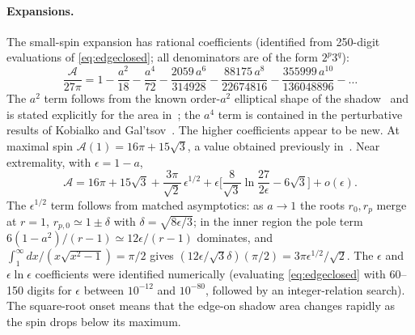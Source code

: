 \documentclass[11pt,a4paper]{article}
\theoremstyle{remark}
\numberwithin{equation}{section}
\begin{document}
\paragraph{Expansions.} The small-spin expansion has rational coefficients (identified from 250-digit
evaluations of \eqref{eq:edgeclosed}; all denominators are of the form $2^p3^q$):
\begin{equation}
\frac{\mathcal A}{27\pi}=1-\frac{a^2}{18}-\frac{a^4}{72}-\frac{2059\,a^6}{314928}-\frac{88175\,a^8}{22674816}
-\frac{355999\,a^{10}}{136048896}-\dots
\end{equation}
The $a^2$ term follows from the known order-$a^2$ elliptical shape of the shadow~\cite{Bozza2006,GrallaLupsasca2020shape}
and is stated explicitly for the area in~\cite{Hassanabadi2026}; the $a^4$ term is contained in the perturbative results of
Kobialko and Gal'tsov~\cite{KobialkoGaltsov2026}. The higher coefficients appear to be new. At maximal spin $\mathcal A(1)=16\pi+15\sqrt3$, a value
obtained previously in~\cite{CunhaHerdeiroRadu2019,FengLu2020}. Near extremality, with $\epsilon=1-a$,
\begin{equation}
\mathcal A=16\pi+15\sqrt3+\frac{3\pi}{\sqrt2}\,\epsilon^{1/2}
+\epsilon\Big[\frac{8}{\sqrt3}\ln\frac{27}{2\epsilon}-6\sqrt3\Big]+o(\epsilon).
\label{eq:nearext}
\end{equation}
The $\epsilon^{1/2}$ term follows from matched asymptotics: as $a\to1$ the roots $r_0,r_p$ merge at $r=1$,
$r_{p,0}\simeq1\pm\delta$ with $\delta=\sqrt{8\epsilon/3}$; in the inner region the pole term
$6(1-a^2)/(r-1)\simeq12\epsilon/(r-1)$ dominates, and
$\int_1^\infty dx/(x\sqrt{x^2-1})=\pi/2$ gives $(12\epsilon/\sqrt3\delta)(\pi/2)=3\pi\epsilon^{1/2}/\sqrt2$.
The $\epsilon$ and $\epsilon\ln\epsilon$ coefficients were identified numerically (evaluating \eqref{eq:edgeclosed} with 60--150 digits
for $\epsilon$ between $10^{-12}$ and $10^{-80}$, followed by an integer-relation search). The square-root onset means that the edge-on shadow area
changes rapidly as the spin drops below its maximum.
\end{document}
